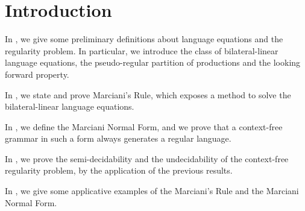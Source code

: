 \section{Introduction}
\label{sec:introduction}

In , we give some preliminary definitions about language
equations and the regularity problem.
In particular, we introduce the class of bilateral-linear language equations,
the pseudo-regular partition of productions and the looking forward property.

In , we state and prove Marciani's Rule, which exposes
a method to solve the bilateral-linear language equations.

In , we define the Marciani Normal Form, and we
prove that a context-free grammar in such a form always generates a regular
language.

In , we prove the semi-decidability and the
undecidability of the context-free regularity problem, by the application of the 
previous results.

In , we give some applicative examples of the Marciani's Rule
and the Marciani Normal Form.
